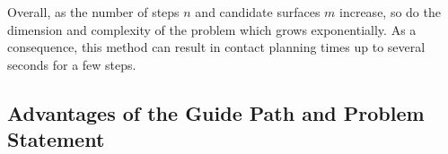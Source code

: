 Overall, as the number of steps $n$ and candidate surfaces $m$ increase, so do the dimension and complexity of the problem which grows exponentially. As a consequence, this method can result in contact planning times up to several seconds for a few steps.


\subsection{Advantages of the Guide Path and Problem Statement}

